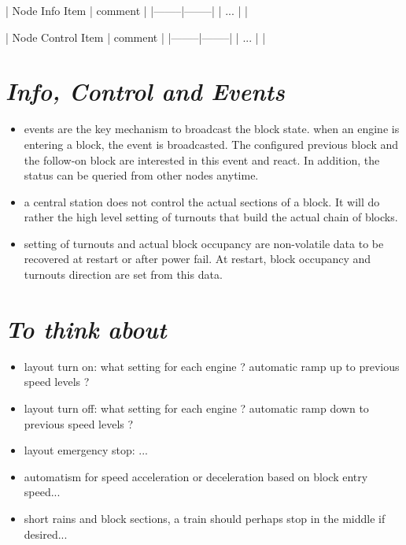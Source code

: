 | Node Info Item | comment |
|--------|--------|
| ... | |

| Node Control Item | comment |
|--------|--------|
| ... | |


\section{\textit{Info, Control and Events}}
\begin{itemize}
\begin{itemize}
\item events are the key mechanism to broadcast the block state. when an engine is entering a block, the event is broadcasted. The configured previous block and the follow-on block are interested in this event and react. In addition, the status can be queried from other nodes anytime.
\item a central station does not control the actual sections of a block. It will do rather the high level setting of turnouts that build the actual chain of blocks.
\item setting of turnouts and actual block occupancy are non-volatile data to be recovered at restart or after power fail. At restart, block occupancy and turnouts direction are set from this data.
\end{itemize}
\end{itemize}

\section{\textit{To think about}}
\begin{itemize}
\begin{itemize}
\item layout turn on: what setting for each engine ? automatic ramp up to previous speed levels ?
\item layout turn off: what setting for each engine ? automatic ramp down to previous speed levels ?
\item layout emergency stop: ...
\item automatism for speed acceleration or deceleration based on block entry speed...
\item short rains and block sections, a train should perhaps stop in the middle if desired...
\end{itemize}
\end{itemize}

